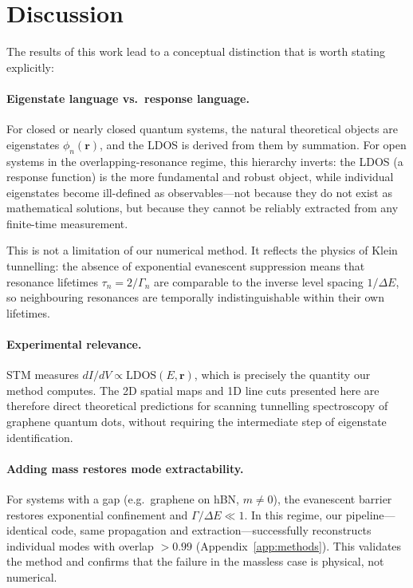 \documentclass[11pt,a4paper]{article}
\newcommand{\vb}[1]{\mathbf{#1}}
\begin{document}
\section{Discussion}
\label{sec:discussion}

The results of this work lead to a conceptual distinction that is
worth stating explicitly:

\paragraph{Eigenstate language vs.\ response language.}
For closed or nearly closed quantum systems, the natural theoretical
objects are eigenstates $\phi_n(\vb{r})$, and the LDOS is derived from
them by summation.  For open systems in the overlapping-resonance
regime, this hierarchy inverts: the LDOS (a response function) is the
more fundamental and robust object, while individual eigenstates
become ill-defined as observables---not because they do not exist as
mathematical solutions, but because they cannot be reliably extracted
from any finite-time measurement.

This is not a limitation of our numerical method.  It reflects the
physics of Klein tunnelling: the absence of exponential evanescent
suppression means that resonance lifetimes $\tau_n = 2/\Gamma_n$ are
comparable to the inverse level spacing $1/\Delta E$, so neighbouring
resonances are temporally indistinguishable within their own lifetimes.

\paragraph{Experimental relevance.}
STM measures $dI/dV \propto \text{LDOS}(E, \vb{r})$, which is
precisely the quantity our method computes.  The 2D spatial maps
and 1D line cuts presented here are therefore direct theoretical
predictions for scanning tunnelling spectroscopy of graphene quantum
dots, without requiring the intermediate step of eigenstate
identification.

\paragraph{Adding mass restores mode extractability.}
For systems with a gap (e.g.\ graphene on hBN, $m \neq 0$), the
evanescent barrier restores exponential confinement and
$\Gamma/\Delta E \ll 1$.  In this regime, our pipeline---identical
code, same propagation and extraction---successfully reconstructs
individual modes with overlap $> 0.99$ (Appendix~\ref{app:methods}).
This validates the method and confirms that the failure in the
massless case is physical, not numerical.
\end{document}
